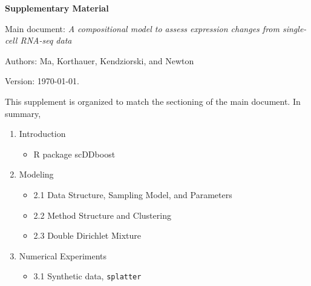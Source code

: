 \documentclass[aoas,preprint]{imsart}
\begin{document}
\large
\centerline{\bf Supplementary Material }

\noindent
Main document: {\em A compositional model to assess expression changes from single-cell RNA-seq data}

\vspace{.2in}
\noindent
Authors: Ma, Korthauer, Kendziorski, and Newton

\vspace{.2in}
\noindent
Version:  \today.  

\vspace{.4in}

\noindent
This supplement is organized to match the sectioning of the main document.   In summary,

\begin{enumerate}
\item Introduction
   \begin{itemize}
   \item R package scDDboost
   \end{itemize}
\item Modeling
 \begin{itemize}
  \item 2.1 Data Structure, Sampling Model, and Parameters
  \item 2.2 Method Structure and Clustering 
  \item 2.3 Double Dirichlet Mixture
  \end{itemize}
\item Numerical Experiments
   \begin{itemize}
   \item 3.1 Synthetic data, \verb+splatter+

\end{itemize}
\end{enumerate}
\end{document}
